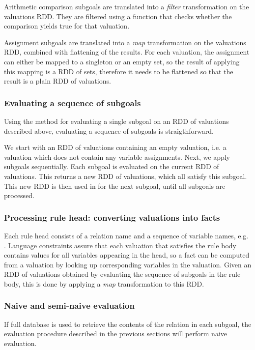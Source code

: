 Arithmetic comparison subgoals are translated into a \emph{filter} transformation on the valuations RDD. They are filtered using a function that checks whether the comparison yields true for that valuation. 

Assignment subgoals are translated into a \emph{map} transformation on the valuations RDD, combined with flattening of the results. For each valuation, the assignment can either be mapped to a singleton or an empty set, so the result of applying this mapping is a RDD of sets, therefore it needs to be flattened so that the result is a plain RDD of valuations.

\subsubsection{Evaluating a sequence of subgoals}
Using the method for evaluating a single subgoal on an RDD of valuations described above, evaluating a sequence of subgoals is straigthforward. 

We start with an RDD of valuations containing an empty valuation, i.e. a valuation which does not contain any variable assignments. Next, we apply subgoals sequentially. Each subgoal is evaluated on the current RDD of valuations. This returns a new RDD of valuations, which all satisfy this subgoal. This new RDD is then used in for the next subgoal, until all subgoals are processed.

\subsubsection{Processing rule head: converting valuations into facts}

Each rule head consists of a relation name and a sequence of variable names, e.g. . Language constraints assure that each valuation that satisfies the rule body contains values for all variables appearing in the head, so a fact can be computed from a valuation by looking up corresponding variables in the valuation. Given an RDD of valuations obtained by evaluating the sequence of subgoals in the rule body, this is done by applying a \emph{map} transformation to this RDD.

\subsubsection{Naive and semi-naive evaluation}
If full database is used to retrieve the contents of the relation in each subgoal, the evaluation procedure described in the previous sections will perform naive evaluation.

